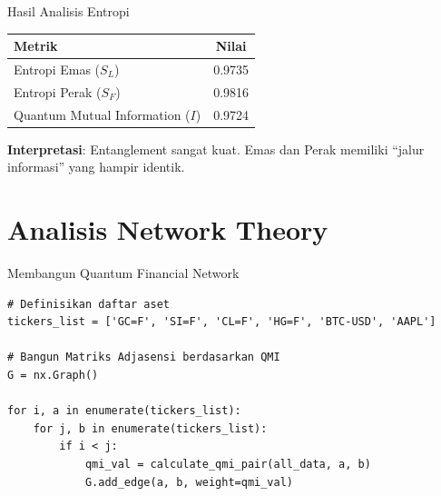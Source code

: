 \documentclass[aspectratio=169]{beamer}
\begin{document}
\begin{frame}{Hasil Analisis Entropi}
    \begin{table}
        \centering
        \begin{tabular}{lc}
            \toprule
            \textbf{Metrik} & \textbf{Nilai} \\
            \midrule
            Entropi Emas ($S_L$) & 0.9735 \\
            Entropi Perak ($S_F$) & 0.9816 \\
            Quantum Mutual Information ($I$) & 0.9724 \\
            \bottomrule
        \end{tabular}
    \end{table}
    
    \vspace{0.5cm}
    
    \textbf{Interpretasi}: Entanglement sangat kuat. Emas dan Perak memiliki ``jalur informasi'' yang hampir identik.
\end{frame}

\section{Analisis Network Theory}

\begin{frame}[fragile]{Membangun Quantum Financial Network}
\begin{lstlisting}
# Definisikan daftar aset
tickers_list = ['GC=F', 'SI=F', 'CL=F', 'HG=F', 'BTC-USD', 'AAPL']

# Bangun Matriks Adjasensi berdasarkan QMI
G = nx.Graph()

for i, a in enumerate(tickers_list):
    for j, b in enumerate(tickers_list):
        if i < j:
            qmi_val = calculate_qmi_pair(all_data, a, b)
            G.add_edge(a, b, weight=qmi_val)
\end{lstlisting}
\end{frame}
\end{document}
